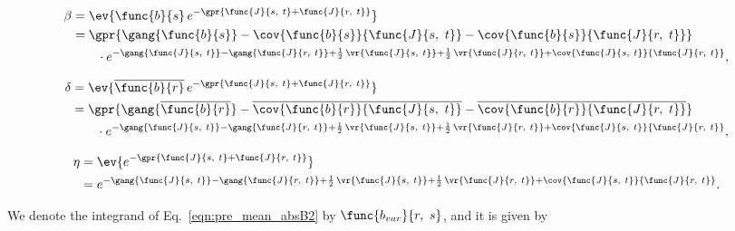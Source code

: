 \begin{align}
    \beta &= \ev{\func{b}{s}\,e^{-\gpr{\func{J}{s,\ t} + \func{J}{r,\ t}}}} \nonumber \\
    	&= \gpr{\gang{\func{b}{s}} - \cov{\func{b}{s}}{\func{J}{s,\ t}} - \cov{\func{b}{s}}{\func{J}{r,\ t}}} \nonumber \\
    		&\qquad \cdot e^{-\gang{\func{J}{s,\ t}} - \gang{\func{J}{r,\ t}} + \frac{1}{2}\,\vr{\func{J}{s,\ t}} + \frac{1}{2}\,\vr{\func{J}{r,\ t}} + \cov{\func{J}{s,\ t}}{\func{J}{r,\ t}}},
\end{align}

\begin{align}
    \delta &= \ev{\overline{\func{b}{r}}\,e^{-\gpr{\func{J}{s,\ t} + \func{J}{r,\ t}}}} \nonumber \\
    	&= \gpr{\gang{\overline{\func{b}{r}}} - \overline{\cov{\func{b}{r}}{\func{J}{s,\ t}}} - \overline{\cov{\func{b}{r}}{\func{J}{r,\ t}}}} \nonumber \\
    	&\qquad \cdot e^{-\gang{\func{J}{s,\ t}} - \gang{\func{J}{r,\ t}} + \frac{1}{2}\,\vr{\func{J}{s,\ t}} + \frac{1}{2}\,\vr{\func{J}{r,\ t}} + \cov{\func{J}{s,\ t}}{\func{J}{r,\ t}}},
\end{align}

\begin{align}
    \eta &= \ev{e^{-\gpr{\func{J}{s,\ t} + \func{J}{r,\ t}}}} \nonumber \\
    	&= e^{-\gang{\func{J}{s,\ t}} - \gang{\func{J}{r,\ t}} + \frac{1}{2}\,\vr{\func{J}{s,\ t}} + \frac{1}{2}\,\vr{\func{J}{r,\ t}} + \cov{\func{J}{s,\ t}}{\func{J}{r,\ t}}}.
\end{align}

We denote the integrand of Eq.~\ref{eqn:pre_mean_absB2} by $\func{b_{var}}{r,\ s}$, and it is given by

